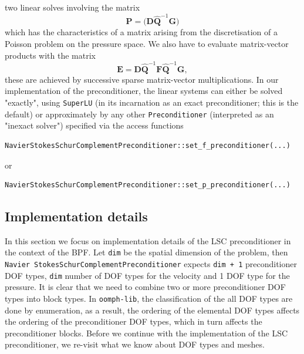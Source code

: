 two linear solves involving the matrix
\begin{equation*}
{\mathbf P} = \big({\mathbf D} \widehat{\mathbf Q}^{-1}{\mathbf G} \big)
\end{equation*}
which has the characteristics of a matrix arising from the discretisation of a
Poisson problem on the pressure space. We also have to evaluate matrix-vector
products with the matrix 
\begin{equation*}
{\mathbf E}={\mathbf D}\widehat{\mathbf Q}^{-1}{\mathbf F}\widehat{\mathbf Q}^{-1}{\mathbf G},
\end{equation*}
these are achieved by successive sparse matrix-vector multiplications.
In our implementation of the preconditioner, the linear systems
can either be solved "exactly", using \texttt{SuperLU} (in its incarnation
as an exact preconditioner; this is the default) or approximately by any 
other \texttt{Preconditioner} (interpreted as an "inexact solver")
specified via the access functions
\begin{verbatim}
NavierStokesSchurComplementPreconditioner::set_f_preconditioner(...)
\end{verbatim}
or 
\begin{verbatim}
NavierStokesSchurComplementPreconditioner::set_p_preconditioner(...)
\end{verbatim}

\subsection{Implementation details\label{sec:lsc_implementation}}
In this section we focus on implementation details of the LSC preconditioner in the context of the BPF. Let \texttt{dim} be the
spatial dimension of the problem, then \texttt{Navier\allowbreak
  Stokes\allowbreak Schur\allowbreak Complement\allowbreak Preconditioner}
expects \texttt{dim + 1} preconditioner DOF types, \texttt{dim} number of DOF
types for the velocity and 1 DOF type for the pressure. It is clear that we
need to combine two or more preconditioner DOF types into block types. In
\texttt{oomph-\allowbreak lib}, the classification of the all DOF types are
done by enumeration, as a result, the ordering of the elemental DOF types
affects the ordering of the preconditioner DOF types, which in turn affects the
preconditioner blocks. Before we continue with the implementation of the LSC
preconditioner, we re-visit what we know about DOF types and meshes.

